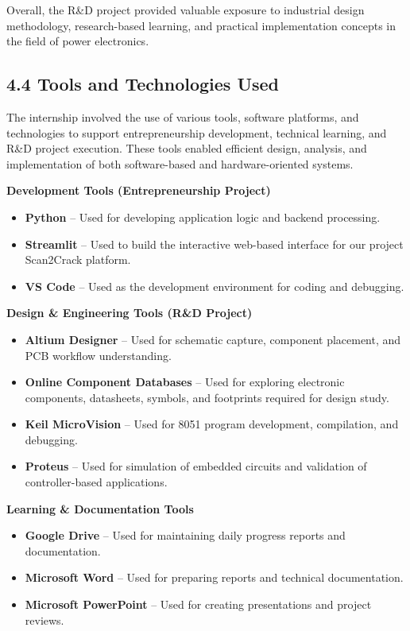 \documentclass[10pt]{article}
\begin{document}
\noindent
Overall, the R\&D project provided valuable exposure to industrial design methodology, research-based learning, and practical implementation concepts in the field of power electronics.

\subsection*{4.4 Tools and Technologies Used}

\noindent
The internship involved the use of various tools, software platforms, and technologies to support entrepreneurship development, technical learning, and R\&D project execution. These tools enabled efficient design, analysis, and implementation of both software-based and hardware-oriented systems.

\textbf{Development Tools (Entrepreneurship Project)}
\begin{itemize}
\item \textbf{Python} -- Used for developing application logic and backend processing.
\item \textbf{Streamlit} -- Used to build the interactive web-based interface for our project Scan2Crack platform.
\item \textbf{VS Code} -- Used as the development environment for coding and debugging.
\end{itemize}

\textbf{Design \& Engineering Tools (R\&D Project)}
\begin{itemize}
\item \textbf{Altium Designer} -- Used for schematic capture, component placement, and PCB workflow understanding.
\item \textbf{Online Component Databases} -- Used for exploring electronic components, datasheets, symbols, and footprints required for design study.
\item \textbf{Keil MicroVision} -- Used for 8051 program development, compilation, and debugging.
\item \textbf{Proteus} -- Used for simulation of embedded circuits and validation of controller-based applications.
\end{itemize}

\textbf{Learning \& Documentation Tools}
\begin{itemize}
\item \textbf{Google Drive} -- Used for maintaining daily progress reports and documentation.
\item \textbf{Microsoft Word} -- Used for preparing reports and technical documentation.
\item \textbf{Microsoft PowerPoint} -- Used for creating presentations and project reviews.
\end{itemize}
\end{document}
